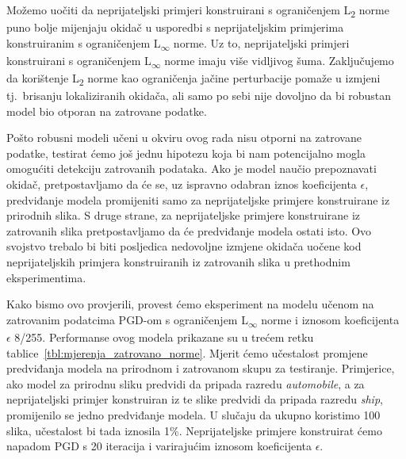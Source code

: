 \documentclass[times, utf8, zavrsni, numeric]{fer}
\begin{document}
Možemo uočiti da neprijateljski primjeri konstruirani s ograničenjem L\textsubscript{2} norme puno bolje mijenjaju okidač u usporedbi s neprijateljskim primjerima konstruiranim s ograničenjem L\textsubscript{$\infty$} norme.
Uz to, neprijateljski primjeri konstruirani s ograničenjem L\textsubscript{$\infty$} norme imaju više vidljivog šuma.
Zaključujemo da korištenje L\textsubscript{2} norme kao ograničenja jačine perturbacije pomaže u izmjeni tj.\ brisanju lokaliziranih okidača, ali samo po sebi nije dovoljno da bi robustan model bio otporan na zatrovane podatke.

\pagebreak

Pošto robusni modeli učeni u okviru ovog rada nisu otporni na zatrovane podatke, testirat ćemo još jednu hipotezu koja bi nam potencijalno mogla omogućiti detekciju zatrovanih podataka. 
Ako je model naučio prepoznavati okidač, pretpostavljamo da će se, uz ispravno odabran iznos koeficijenta $\epsilon$, predviđanje modela promijeniti samo za neprijateljske primjere konstruirane iz prirodnih slika.
S druge strane, za neprijateljske primjere konstruirane iz zatrovanih slika pretpostavljamo da će predviđanje modela ostati isto. Ovo svojstvo trebalo bi biti posljedica nedovoljne izmjene okidača uočene kod neprijateljskih primjera konstruiranih iz zatrovanih slika u prethodnim eksperimentima.

Kako bismo ovo provjerili, provest ćemo eksperiment na modelu učenom na zatrovanim podatcima PGD-om s ograničenjem L\textsubscript{$\infty$} norme i iznosom koeficijenta $\epsilon$ 8/255. Performanse ovog modela prikazane su u trećem retku tablice~\ref{tbl:mjerenja_zatrovano_norme}.
Mjerit ćemo učestalost promjene predviđanja modela na prirodnom i zatrovanom skupu za testiranje. 
Primjerice, ako model za prirodnu sliku predvidi da pripada razredu \textit{automobile}, a za neprijateljski primjer konstruiran iz te slike predvidi da pripada razredu \textit{ship}, promijenilo se jedno predviđanje modela.
U slučaju da ukupno koristimo 100 slika, učestalost bi tada iznosila 1\%.
Neprijateljske primjere konstruirat ćemo napadom PGD s 20 iteracija i varirajućim iznosom koeficijenta $\epsilon$.
\end{document}
